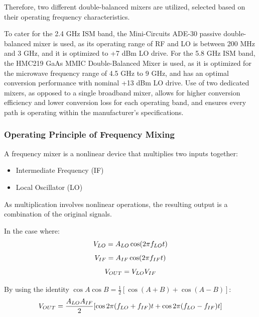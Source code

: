 \documentclass[12pt,a4paper]{report}
\begin{document}
	Therefore, two different double-balanced mixers are utilized, selected based on their operating frequency characteristics.
	
	To cater for the 2.4 GHz ISM band, the Mini-Circuits ADE-30 passive double-balanced mixer is used, as its operating range of RF and LO is between 200 MHz and 3 GHz, and it is optimized to +7 dBm LO drive. For the 5.8 GHz ISM band, the HMC219 GaAs MMIC Double-Balanced Mixer is used, as it is optimized for the microwave frequency range of 4.5 GHz to 9 GHz, and has an optimal conversion performance with nominal +13 dBm LO drive. Use of two dedicated mixers, as opposed to a single broadband mixer, allows for higher conversion efficiency and lower conversion loss for each operating band, and ensures every path is operating within the manufacturer's specifications.
	
	\subsubsection{Operating Principle of Frequency Mixing}
	A frequency mixer is a nonlinear device that multiplies two inputs together:
	\begin{itemize}
		\item Intermediate Frequency (IF)
		\item Local Oscillator (LO)
	\end{itemize}
	
	As multiplication involves nonlinear operations, the resulting output is a combination of the original signals.
	
	In the case where:
	\begingroup
	\setlength{\mathindent}{0pt}
	\begin{equation*}
		\hfill
		V_{LO} = A_{LO} \cos(2\pi f_{LO} t)
		\hfill
	\end{equation*}
	\endgroup
	\begingroup
	\setlength{\mathindent}{0pt}
	\begin{equation*}
		\hfill
		V_{IF} = A_{IF} \cos(2\pi f_{IF} t)
		\hfill
	\end{equation*}
	\endgroup
	\begingroup
	\setlength{\mathindent}{0pt}
	\begin{equation*}
		\hfill
		V_{OUT} = V_{LO} V_{IF}
		\hfill
	\end{equation*}
	\endgroup
	
	By using the identity $\cos A \cos B = \frac{1}{2}[\cos(A + B) + \cos(A - B)]$:
	\begingroup
	\setlength{\mathindent}{0pt}
	\begin{equation*}
		\hfill
		V_{OUT} = \frac{A_{LO} A_{IF}}{2}[\cos 2\pi(f_{LO} + f_{IF})t + \cos 2\pi(f_{LO} - f_{IF})t]
		\hfill
	\end{equation*}
	\endgroup
	
\end{document}
